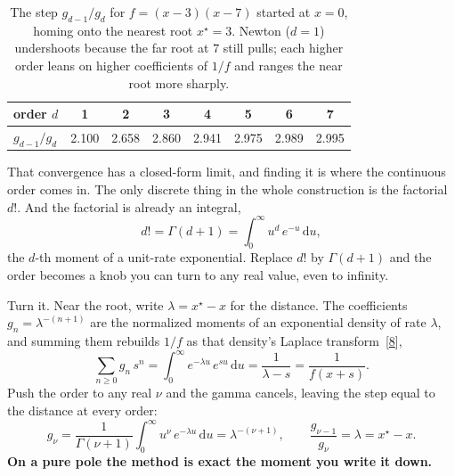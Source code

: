 \documentclass[11pt]{article}
\newcommand{\dd}{\mathrm{d}}
\newcommand{\order}{d}                  %
\begin{document}
\begin{table}[ht]
\centering
\caption{The step $g_{\order-1}/g_\order$ for $f=(x-3)(x-7)$ started at $x=0$, homing
onto the nearest root $x^\star=3$. Newton ($\order=1$) undershoots because the far
root at $7$ still pulls; each higher order leans on higher coefficients of $1/f$ and
ranges the near root more sharply.}
\label{tab:ratiotest}
\renewcommand{\arraystretch}{1.3}
\begin{tabular}{l c c c c c c c}
\toprule
order $\order$ & 1 & 2 & 3 & 4 & 5 & 6 & 7 \\
\midrule
$g_{\order-1}/g_\order$ & 2.100 & 2.658 & 2.860 & 2.941 & 2.975 & 2.989 & 2.995 \\
\bottomrule
\end{tabular}
\end{table}

That convergence has a closed-form limit, and finding it is where the continuous
order comes in. The only discrete thing in the whole construction is the factorial
$\order!$. And the factorial is already an integral,
\begin{equation}
  \order! = \Gamma(\order+1) = \int_0^\infty u^{\order}\,e^{-u}\,\dd u,
  \label{eq:gamma}
\end{equation}
the $\order$-th moment of a unit-rate exponential. Replace $\order!$ by
$\Gamma(\order+1)$ and the order becomes a knob you can turn to any real value, even
to infinity.

Turn it. Near the root, write $\lambda=x^\star-x$ for the distance. The coefficients
$g_n=\lambda^{-(n+1)}$ are the normalized moments of an exponential density of rate
$\lambda$, and summing them rebuilds $1/f$ as that density's Laplace
transform~[\hyperlink{ref:8}{8}],
\begin{equation}
  \sum_{n\ge0} g_n\,s^{n}
   = \int_0^\infty e^{-\lambda u}\,e^{s u}\,\dd u
   = \frac{1}{\lambda-s}
   = \frac{1}{f(x+s)}.
  \label{eq:mgf}
\end{equation}
Push the order to any real $\nu$ and the gamma cancels, leaving the step equal to the
distance at every order:
\begin{equation}
  g_\nu = \frac{1}{\Gamma(\nu+1)}\int_0^\infty u^{\nu}\,e^{-\lambda u}\,\dd u
        = \lambda^{-(\nu+1)},
  \qquad
  \frac{g_{\nu-1}}{g_\nu} = \lambda = x^\star-x.
  \label{eq:contstep}
\end{equation}
\textbf{On a pure pole the method is exact the moment you write it down.}
\end{document}
